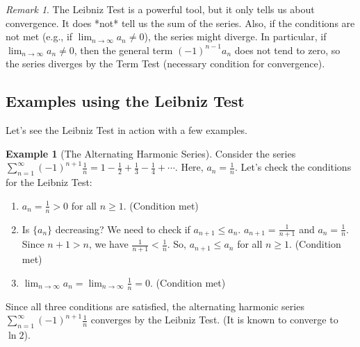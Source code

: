 \documentclass[11pt, a4paper]{article}
\theoremstyle{plain}
\theoremstyle{definition}
\newtheorem{example}[theorem]{Example} %
\theoremstyle{remark}
\newtheorem{remark}[theorem]{Remark}
\begin{document}
\begin{remark}
The Leibniz Test is a powerful tool, but it only tells us about convergence. It does *not* tell us the sum of the series. Also, if the conditions are not met (e.g., if $\lim_{n \to \infty} a_n \neq 0$), the series might diverge. In particular, if $\lim_{n \to \infty} a_n \neq 0$, then the general term $ (-1)^{n-1} a_n $ does not tend to zero, so the series diverges by the Term Test (necessary condition for convergence).
\end{remark}

\subsection{Examples using the Leibniz Test}

Let's see the Leibniz Test in action with a few examples.

\begin{example}[The Alternating Harmonic Series]
Consider the series $\sum_{n=1}^{\infty} (-1)^{n+1} \frac{1}{n} = 1 - \frac{1}{2} + \frac{1}{3} - \frac{1}{4} + \dotsb$.
Here, $a_n = \frac{1}{n}$. Let's check the conditions for the Leibniz Test:
\begin{enumerate}[label=(\roman*)]
    \item $a_n = \frac{1}{n} > 0$ for all $n \ge 1$. (Condition met)
    \item Is $\{a_n\}$ decreasing? We need to check if $a_{n+1} \le a_n$.
    $a_{n+1} = \frac{1}{n+1}$ and $a_n = \frac{1}{n}$. Since $n+1 > n$, we have $\frac{1}{n+1} < \frac{1}{n}$. So, $a_{n+1} \le a_n$ for all $n \ge 1$. (Condition met)
    \item $\lim_{n \to \infty} a_n = \lim_{n \to \infty} \frac{1}{n} = 0$. (Condition met)
\end{enumerate}
Since all three conditions are satisfied, the alternating harmonic series $\sum_{n=1}^{\infty} (-1)^{n+1} \frac{1}{n}$ converges by the Leibniz Test. (It is known to converge to $\ln 2$).
\end{example}
\end{document}
